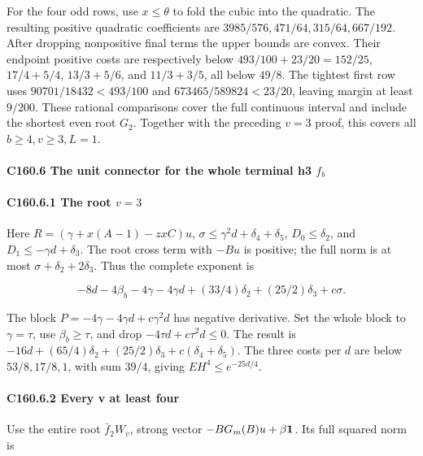 For the four odd rows, use \(x\le\theta\) to fold the cubic into the quadratic. The resulting positive quadratic coefficients are \(3985/576,\allowbreak \allowbreak  471/64,\allowbreak \allowbreak  315/64,\allowbreak \allowbreak  667/192\). After dropping nonpositive final terms the upper bounds are convex. Their endpoint positive costs are respectively below \(493/100+23/20=152/25\), \(17/4+5/4\), \(13/3+5/6\), and \(11/3+3/5\), all below \(49/8\). The tightest first row uses \(90701/18432<493/100\) and \(673465/589824<23/20\), leaving margin at least \(9/200\). These rational comparisons cover the full continuous interval and include the shortest even root \(G_2\). Together with the preceding \(v=3\) proof, this covers all \(b\ge4,\allowbreak \allowbreak  v\ge3,\allowbreak \allowbreak  L=1\).

\paragraph{C160.6 The unit connector for the whole terminal h3 \(f_b\)}

\paragraph{C160.6.1 The root \(v=3\)}

Here \(R=(\gamma+x(A-1)-zxC)u\), \(\sigma\le\gamma^2d+\delta_4+\delta_5\), \(D_0\le \delta_2\), and \(D_1\le-\gamma d+\delta_3\). The root cross term with \(-Bu\) is positive; the full norm is at most \(\sigma+\delta_2+2\delta_3\). Thus the complete exponent is

\[
-8d-4\beta_b-4\gamma-4\gamma d+(33/4)\delta_2+(25/2)\delta_3+c\sigma.
\]

The block \(P=-4\gamma-4\gamma d+c\gamma^2d\) has negative derivative. Set the whole block to \(\gamma=\tau\), use \(\beta_b\ge\tau\), and drop \(-4\tau d+c\tau^2d\le0\). The result is \(-16d+(65/4)\delta_2+(25/2)\delta_3+c(\delta_4+\delta_5)\). The three costs per \(d\) are below \(53/8,\allowbreak \allowbreak  17/8,\allowbreak \allowbreak  1\), with sum \(39/4\), giving \(EH^4\le e^{-25d/4}\).

\paragraph{C160.6.2 Every v at least four}

Use the entire root \(\bar f_2W_v\), strong vector \(-BG_m(B)u+\beta\mathbf1\). Its full squared norm is


